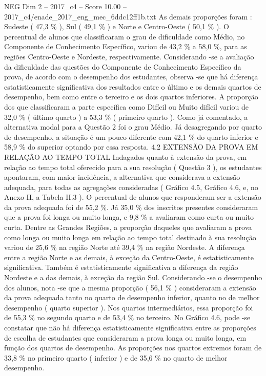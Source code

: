 \begin{textsample}{NEG Dim 2 – 2017\_c4 – Score 10.00 – 2017\_c4/enade\_2017\_eng\_mec\_6ddc12ff1b.txt}
As demais proporções foram : Sudeste ( 47,3 \% ), Sul ( 49,1 \% ) e Norte e Centro-Oeste ( 50,1 \% ).
O percentual de alunos que classificaram o grau de dificuldade como Médio, no Componente de Conhecimento Específico, variou de 43,2 \% a 58,0 \%, para as regiões Centro-Oeste e Nordeste, respectivamente.
Considerando -se a avaliação da dificuldade das questões do Componente de Conhecimento Específico da prova, de acordo com o desempenho dos estudantes, observa -se que há diferença estatisticamente significativa dos resultados entre o último e os demais quartos de desempenho, bem como entre o terceiro e os dois quartos inferiores.
A proporção dos que classificaram a parte específica como Difícil ou Muito difícil variou de 32,0 \% ( último quarto ) a 53,3 \% ( primeiro quarto ).
Como já comentado, a alternativa modal para a Questão 2 foi o grau Médio.
Já desagregando por quarto de desempenho, a situação é um pouco diferente com 42,1 \% do quarto inferior e 58,9 \% do superior optando por essa resposta. 4.2 EXTENSÃO DA PROVA EM RELAÇÃO AO TEMPO TOTAL Indagados quanto à extensão da prova, em relação ao tempo total oferecido para a sua resolução ( Questão 3 ), os estudantes apontaram, com maior incidência, a alternativa que considerava a extensão adequada, para todas as agregações consideradas ( Gráfico 4.5, Gráfico 4.6, e, no Anexo II, a Tabela II.3 ).
O percentual de alunos que responderam ser a extensão da prova adequada foi de 55,2 \%.
Já 35,0 \% dos inscritos presentes consideraram que a prova foi longa ou muito longa, e 9,8 \% a avaliaram como curta ou muito curta.
Dentre as Grandes Regiões, a proporção daqueles que avaliaram a prova como longa ou muito longa em relação ao tempo total destinado à sua resolução variou de 25,6 \% na região Norte até 39,4 \% na região Nordeste.
A diferença entre a região Norte e as demais, à exceção da Centro-Oeste, é estatisticamente significativa.
Também é estatisticamente significativa a diferença da região Nordeste e a das demais, à exceção da região Sul.
Considerando -se o desempenho dos alunos, nota -se que a mesma proporção ( 56,1 \% ) consideraram a extensão da prova adequada tanto no quarto de desempenho inferior, quanto no de melhor desempenho ( quarto superior ).
Nos quartos intermediários, essa proporção foi de 55,3 \% no segundo quarto e de 53,4 \% no terceiro.
No Gráfico 4.6, pode -se constatar que não há diferença estatisticamente significativa entre as proporções de escolha de estudantes que consideraram a prova longa ou muito longa, em função dos quartos de desempenho.
As proporções nos quartos extremos foram de 33,8 \% no primeiro quarto ( inferior ) e de 35,6 \% no quarto de melhor desempenho.

\end{textsample}
